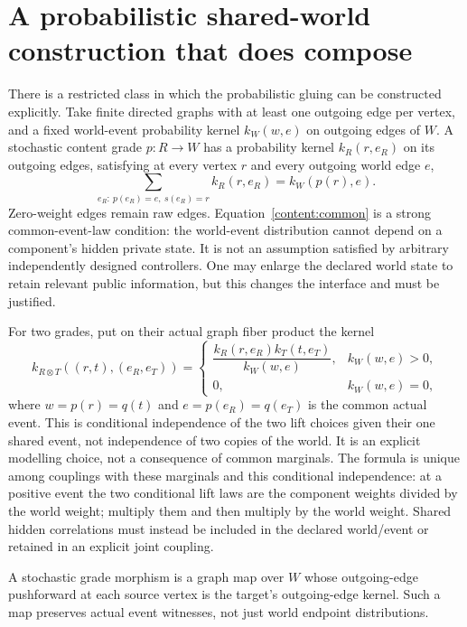 \documentclass[11pt]{article}
\begin{document}
\section{A probabilistic shared-world construction that does compose}
There is a restricted class in which the probabilistic gluing can be constructed explicitly. Take finite directed graphs with at least one outgoing edge per vertex, and a fixed world-event probability kernel $k_W(w,e)$ on outgoing edges of $W$. A stochastic content grade $p:R\to W$ has a probability kernel $k_R(r,e_R)$ on its outgoing edges, satisfying at every vertex $r$ and every outgoing world edge $e$,
\begin{equation}\label{content:common}
 \sum_{e_R:\ p(e_R)=e,\ s(e_R)=r}k_R(r,e_R)=k_W(p(r),e).
\end{equation}
Zero-weight edges remain raw edges. Equation~\eqref{content:common} is a strong common-event-law condition: the world-event distribution cannot depend on a component's hidden private state. It is not an assumption satisfied by arbitrary independently designed controllers. One may enlarge the declared world state to retain relevant public information, but this changes the interface and must be justified.

For two grades, put on their actual graph fiber product the kernel
\begin{equation}\label{content:glue}
 k_{R\otimes T}((r,t),(e_R,e_T))=
 \begin{cases}
 \dfrac{k_R(r,e_R)k_T(t,e_T)}{k_W(w,e)},&k_W(w,e)>0,\\[5pt]
 0,&k_W(w,e)=0,
 \end{cases}
\end{equation}
where $w=p(r)=q(t)$ and $e=p(e_R)=q(e_T)$ is the common actual event. This is conditional independence of the two lift choices given their one shared event, not independence of two copies of the world. It is an explicit modelling choice, not a consequence of common marginals. The formula is unique among couplings with these marginals and this conditional independence: at a positive event the two conditional lift laws are the component weights divided by the world weight; multiply them and then multiply by the world weight. Shared hidden correlations must instead be included in the declared world/event or retained in an explicit joint coupling.

A stochastic grade morphism is a graph map over $W$ whose outgoing-edge pushforward at each source vertex is the target's outgoing-edge kernel. Such a map preserves actual event witnesses, not just world endpoint distributions.
\end{document}
